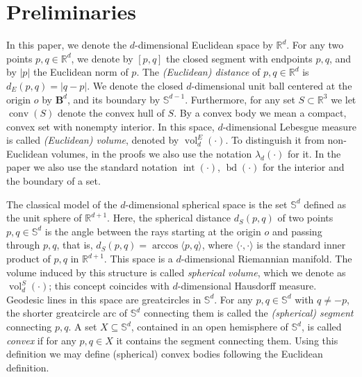 \documentclass[twoside]{amsart}
\theoremstyle{plain}
\theoremstyle{definition}
\numberwithin{equation}{section}
\renewcommand{\Re}{\mathbb R}
\newcommand{\B}{\mathbf{B}}
\newcommand{\Sph}{\mathbb{S}}
\DeclareMathOperator{\inter}{int}
\DeclareMathOperator{\bd}{bd}
\DeclareMathOperator{\conv}{conv}
\DeclareMathOperator{\vol}{vol}
\begin{document}
\section{Preliminaries}\label{sec:prelim}

In this paper, we denote the $d$-dimensional Euclidean space by $\Re^d$. For any two points $p,q \in \Re^d$, we denote by $[p,q]$ the closed segment with endpoints $p,q$, and by $|p|$ the Euclidean norm of $p$. The \emph{(Euclidean) distance} of $p,q \in \Re^d$ is $d_E(p,q)=|q-p|$. We denote the closed $d$-dimensional unit ball centered at the origin $o$ by $\B^d$, and its boundary by $\Sph^{d-1}$. Furthermore, for any set $S \subset \Re^3$ we let $\conv (S)$ denote the convex hull of $S$. By a convex body we mean a compact, convex set with nonempty interior.
In this space, $d$-dimensional Lebesgue measure is called \emph{(Euclidean) volume}, denoted by $\vol_d^E(\cdot)$. To distinguish it from non-Euclidean volumes, in the proofs we also use the notation $\lambda_d(\cdot)$ for it. In the paper we also use the standard notation $\inter(\cdot)$, $\bd(\cdot)$ for the interior and the boundary of a set.

The classical model of the $d$-dimensional spherical space is the set $\Sph^d$ defined as the unit sphere of $\Re^{d+1}$. Here, the spherical distance $d_S(p,q)$ of two points $p,q \in \Sph^d$ is the angle between the rays starting at the origin $o$ and passing through $p,q$, that is, $d_S(p,q)= \arccos \langle p,q \rangle$, where $\langle \cdot, \cdot \rangle$ is the standard inner product of $p,q$ in $\Re^{d+1}$. This space is a $d$-dimensional Riemannian manifold. The volume induced by this structure is called \emph{spherical volume}, which we denote as $\vol_d^S(\cdot)$; this concept coincides with $d$-dimensional Hausdorff measure. Geodesic lines in this space are greatcircles in $\Sph^d$. For any $p,q \in \Sph^d$ with $q \neq -p$, the shorter greatcircle arc of $\Sph^d$ connecting them is called the \emph{(spherical) segment} connecting $p,q$. A set $X \subseteq \Sph^d$, contained in an open hemisphere of $\Sph^d$, is called \emph{convex} if for any $p,q \in X$ it contains the segment connecting them. Using this definition we may define (spherical) convex bodies following the Euclidean definition.
\end{document}
